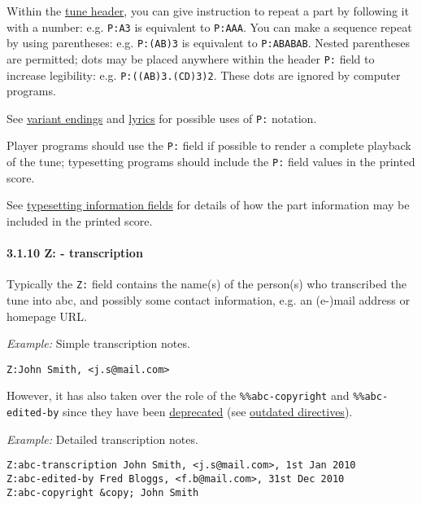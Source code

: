 Within the \protect\hyperlink{tune_header_definition}{tune header}, you
can give instruction to repeat a part by following it with a number:
e.g. \texttt{P:A3} is equivalent to \texttt{P:AAA}. You can make a
sequence repeat by using parentheses: e.g. \texttt{P:(AB)3} is
equivalent to \texttt{P:ABABAB}. Nested parentheses are permitted; dots
may be placed anywhere within the header \texttt{P:} field to increase
legibility: e.g. \texttt{P:((AB)3.(CD)3)2}. These dots are ignored by
computer programs.

See \protect\hyperlink{variant_endings}{variant endings} and
\protect\hyperlink{lyrics}{lyrics} for possible uses of \texttt{P:}
notation.

Player programs should use the \texttt{P:} field if possible to render a
complete playback of the tune; typesetting programs should include the
\texttt{P:} field values in the printed score.

See \protect\hyperlink{typesetting_information_fields}{typesetting
information fields} for details of how the part information may be
included in the printed score.

\hypertarget{ztranscription}{\paragraph{3.1.10 Z: -
transcription}\label{ztranscription}}

Typically the \texttt{Z:} field contains the name(s) of the person(s)
who transcribed the tune into abc, and possibly some contact
information, e.g. an (e-)mail address or homepage URL.

\emph{Example:} Simple transcription notes.

\begin{verbatim}
Z:John Smith, <j.s@mail.com>
\end{verbatim}

However, it has also taken over the role of the
\texttt{\%\%abc-copyright} and \texttt{\%\%abc-edited-by} since they
have been \protect\hyperlink{outdated_syntax}{deprecated} (see
\protect\hyperlink{outdated_directives}{outdated directives}).

\emph{Example:} Detailed transcription notes.

\begin{verbatim}
Z:abc-transcription John Smith, <j.s@mail.com>, 1st Jan 2010
Z:abc-edited-by Fred Bloggs, <f.b@mail.com>, 31st Dec 2010
Z:abc-copyright &copy; John Smith
\end{verbatim}

